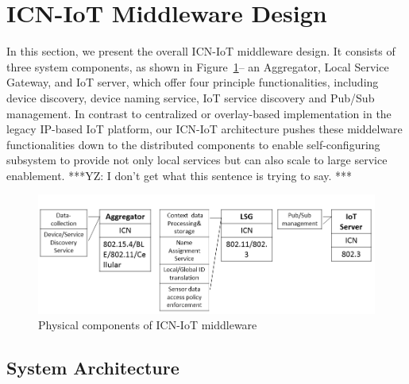 \section{ICN-IoT Middleware Design}
In this section, we present the overall ICN-IoT middleware design. It consists of three system components, as shown in Figure~\ref{fig:phy}-- an Aggregator, Local Service Gateway, and IoT server, which offer four principle functionalities, including device discovery, device naming service, IoT service discovery and Pub/Sub management.
In contrast to centralized or overlay-based implementation in the legacy IP-based IoT platform, our ICN-IoT architecture pushes these middelware functionalities down to the distributed components to enable self-configuring subsystem to provide not only local services but can also scale to large service enablement. ***YZ: I don't get what this sentence is trying to say. ***
\begin{figure}
\includegraphics[width=\columnwidth]{figure/physical_comp.png}
\caption{\label{fig:phy}Physical components of ICN-IoT middleware}
\end{figure}

\subsection{System Architecture}\label{sec:physical}

